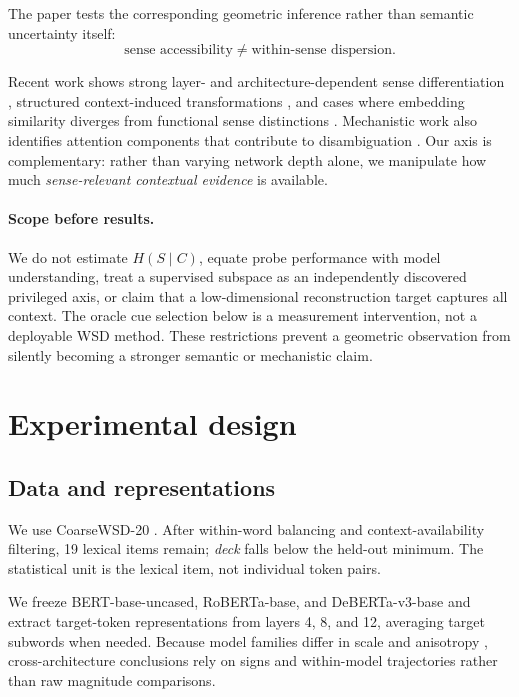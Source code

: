\documentclass[10pt,twocolumn]{article}
\begin{document}
The paper tests the corresponding geometric inference rather than semantic uncertainty itself:
\begin{equation}
\text{sense accessibility}\neq\text{within-sense dispersion}.
\end{equation}

Recent work shows strong layer- and architecture-dependent sense differentiation \cite{ma2025,riviere2025}, structured context-induced transformations \cite{hu2026,xiong2026}, and cases where embedding similarity diverges from functional sense distinctions \cite{scott2026}. Mechanistic work also identifies attention components that contribute to disambiguation \cite{rivieretrott2025}. Our axis is complementary: rather than varying network depth alone, we manipulate how much \emph{sense-relevant contextual evidence} is available.

\paragraph{Scope before results.}
We do not estimate $H(S\mid C)$, equate probe performance with model understanding, treat a supervised subspace as an independently discovered privileged axis, or claim that a low-dimensional reconstruction target captures all context. The oracle cue selection below is a measurement intervention, not a deployable WSD method. These restrictions prevent a geometric observation from silently becoming a stronger semantic or mechanistic claim.

\section{Experimental design}
\subsection{Data and representations}
We use CoarseWSD-20 \cite{loureiro2021}. After within-word balancing and context-availability filtering, 19 lexical items remain; \emph{deck} falls below the held-out minimum. The statistical unit is the lexical item, not individual token pairs.

We freeze BERT-base-uncased, RoBERTa-base, and DeBERTa-v3-base and extract target-token representations from layers 4, 8, and 12, averaging target subwords when needed. Because model families differ in scale and anisotropy \cite{ethayarajh2019,timkey2021}, cross-architecture conclusions rely on signs and within-model trajectories rather than raw magnitude comparisons.
\end{document}
